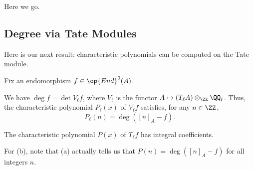 \documentclass[../notes.tex]{subfiles}
\begin{document}
Here we go.

\subsection{Degree via Tate Modules}
Here is our next result: characteristic polynomials can be computed on the Tate module.
\begin{theorem} \label{thm:tate-char-poly}
	Fix an endomorphism $f\in\op{End}^0(A)$.
	\begin{listalph}
		\item We have $\deg f=\det V_\ell f$, where $V_\ell$ is the functor $A\mapsto (T_\ell A)\otimes_\ZZ\QQ_\ell$. Thus, the characteristic polynomial $P_\ell(x)$ of $V_\ell f$ satisfies, for any $n\in\ZZ$,
		\[P_\ell(n)=\deg([n]_A-f).\]
		\item The characteristic polynomial $P(x)$ of $T_\ell f$ has integral coefficients.
	\end{listalph}
\end{theorem}
For (b), note that (a) actually tells us that $P(n)=\deg([n]_A-f)$ for all integers $n$.
\end{document}
